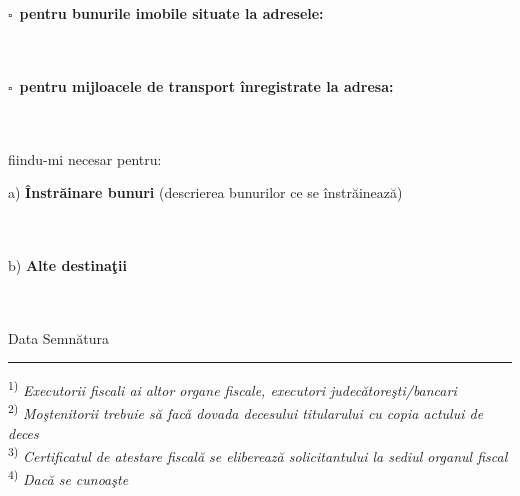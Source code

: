 \documentclass[11pt,a4paper]{article}
\newcommand{\fillline}[1][6cm]{\underline{\hspace{#1}}}
\newcommand{\checkboxempty}{$\square$}
\begin{document}
\vspace{0.4cm}

\checkboxempty\ \textbf{pentru bunurile imobile situate la adresele:} \fillline[8cm]
\\[0.2cm]
\hrulefill
\\[0.2cm]
\hrulefill
\\[0.2cm]
\hrulefill

\vspace{0.4cm}

\checkboxempty\ \textbf{pentru mijloacele de transport înregistrate la adresa:} \fillline[6.5cm]
\\[0.2cm]
\hrulefill
\\[0.2cm]
\hrulefill
\\[0.2cm]
\hrulefill

\vspace{0.4cm}

fiindu-mi necesar pentru:

\vspace{0.2cm}

a) \textbf{Înstrăinare bunuri} (descrierea bunurilor ce se înstrăinează) \fillline[6cm]
\\[0.2cm]
\hrulefill
\\[0.2cm]
\hrulefill
\\[0.2cm]
\hrulefill

\vspace{0.3cm}

b) \textbf{Alte destinaţii} \fillline[10cm]
\\[0.2cm]
\hrulefill
\\[0.2cm]
\hrulefill
\\[0.2cm]
\hrulefill

\vspace{1cm}

\hspace{1cm}Data \fillline[5cm] \hfill Semnătura \fillline[5cm]\hspace{1cm}

\vspace{0.8cm}

\hrule
\vspace{0.2cm}
{\footnotesize
\textsuperscript{1)} \textit{Executorii fiscali ai altor organe fiscale, executori judecătoreşti/bancari}\\
\textsuperscript{2)} \textit{Moştenitorii trebuie să facă dovada decesului titularului cu copia actului de deces}\\
\textsuperscript{3)} \textit{Certificatul de atestare fiscală se eliberează solicitantului la sediul organul fiscal}\\
\textsuperscript{4)} \textit{Dacă se cunoaşte}
}
\end{document}
